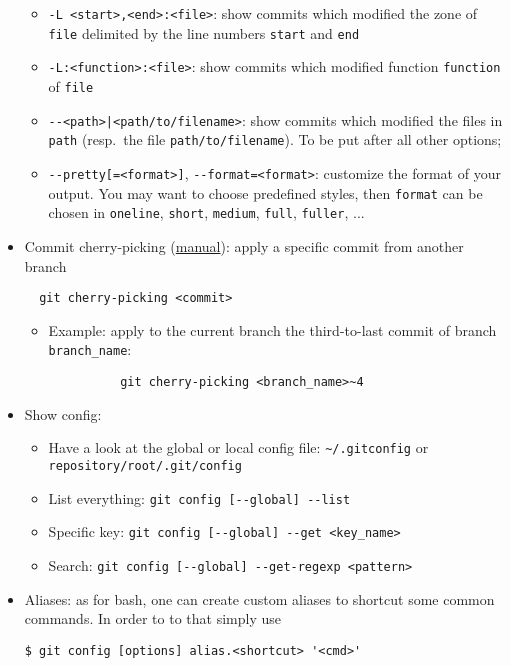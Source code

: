 \documentclass[a4paper,12pt,%
              final%
              ]{article}
\begin{document}
\begin{itemize}
\begin{itemize}
      \item \verb|-L <start>,<end>:<file>|: show commits which modified the zone of \texttt{file} delimited by the line numbers \texttt{start} and \texttt{end}
      \item \verb|-L:<function>:<file>|: show commits which modified function \texttt{function} of \texttt{file}
      \item \verb!--<path>|<path/to/filename>!: show commits which modified the files in \texttt{path} (resp.~the file \verb|path/to/filename|). To be put after all other options;
      \item \verb|--pretty[=<format>]|, \verb|--format=<format>|: customize the format of your output. You may want to choose predefined styles, then \texttt{format} can be chosen in \texttt{oneline}, \texttt{short}, \texttt{medium}, \texttt{full}, \texttt{fuller}, ...
    \end{itemize}
  \item Commit cherry-picking (\href{https://git-scm.com/docs/git-cherry-pick}{manual}): apply a specific commit from another branch
\begin{verbatim}
  git cherry-picking <commit>
\end{verbatim}
    \begin{itemize}
      \item Example: apply to the current branch the third-to-last commit of branch \verb|branch_name|:
        \begin{verbatim}
          git cherry-picking <branch_name>~4
        \end{verbatim}
    \end{itemize}
  \item Show config:
    \begin{itemize}
      \item Have a look at the global or local config file: \verb|~/.gitconfig| or \verb|repository/root/.git/config|
      \item List everything: \verb|git config [--global] --list|
      \item Specific key: \verb|git config [--global] --get <key_name>|
      \item Search: \verb|git config [--global] --get-regexp <pattern>|
    \end{itemize}
  \item Aliases: as for bash, one can create custom aliases to shortcut some common commands. In order to to that simply use
\begin{verbatim}
$ git config [options] alias.<shortcut> '<cmd>'

\end{verbatim}
\end{itemize}
\end{document}
